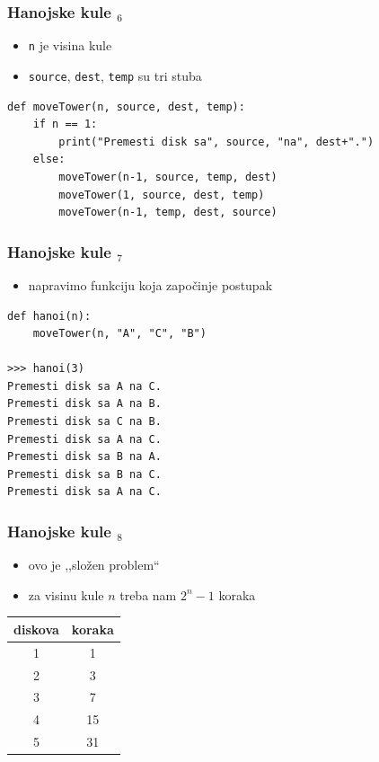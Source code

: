\documentclass[utf8,compress,aspectratio=169]{beamer}
\begin{document}
\begin{frame}[fragile]
  \frametitle{Hanojske kule $_6$}
  \begin{itemize}
    \item \texttt{n} je visina kule
    \item \texttt{source}, \texttt{dest}, \texttt{temp} su tri stuba
  \end{itemize}
\begin{verbatim}
def moveTower(n, source, dest, temp):
    if n == 1:
        print("Premesti disk sa", source, "na", dest+".")
    else:
        moveTower(n-1, source, temp, dest)
        moveTower(1, source, dest, temp)
        moveTower(n-1, temp, dest, source)
\end{verbatim}
\end{frame}

\begin{frame}[fragile]
  \frametitle{Hanojske kule $_7$}
  \begin{itemize}
    \item napravimo funkciju koja započinje postupak
  \end{itemize}
\begin{verbatim}
def hanoi(n):
    moveTower(n, "A", "C", "B")

>>> hanoi(3)
Premesti disk sa A na C.
Premesti disk sa A na B.
Premesti disk sa C na B.
Premesti disk sa A na C.
Premesti disk sa B na A.
Premesti disk sa B na C.
Premesti disk sa A na C.
\end{verbatim}
\end{frame}

\begin{frame}[fragile]
  \frametitle{Hanojske kule $_8$}
  \begin{itemize}
    \item ovo je ,,složen problem``
    \item za visinu kule $n$ treba nam $2^n-1$ koraka
  \end{itemize}
\begin{center}
\begin{tabular}{cc}
\textbf{diskova} & \textbf{koraka} \\ \hline
1 & 1 \\
2 & 3 \\
3 & 7 \\
4 & 15 \\
5 & 31
\end{tabular}
\end{center}
\end{frame}
\end{document}

